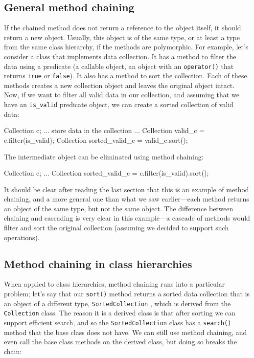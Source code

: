\subsection{General method chaining}

If the chained method does not return a reference to the object itself, it should return a new object. Usually, this object is of the same type, or at least a type from the same class hierarchy, if the methods are polymorphic. For example, let's consider a class that implements data collection. It has a method to filter the data using a predicate (a callable object, an object with an \texttt{operator()} that returns \texttt{true} or \texttt{false}). It also has a method to sort the collection. Each of these methods creates a new collection object and leaves the original object intact. Now, if we want to filter all valid data in our collection, and assuming that we have an \texttt{is\_valid} predicate object, we can create a sorted collection of valid data:

\begin{code}
Collection c;
... store data in the collection ...
Collection valid_c = c.filter(is_valid);
Collection sorted_valid_c = valid_c.sort();
\end{code}

The intermediate object can be eliminated using method chaining:

\begin{code}
Collection c;
...
Collection sorted_valid_c = c.filter(is_valid).sort();
\end{code}

It should be clear after reading the last section that this is an example of method chaining, and a more general one than what we saw earlier---each method returns an object of the same type, but not the same object. The difference between chaining and cascading is very clear in this example---a cascade of methods would filter and sort the original collection (assuming we decided to support such operations).

\subsection{Method chaining in class hierarchies}

When applied to class hierarchies, method chaining runs into a particular problem; let's say that our \texttt{sort()} method returns a sorted data collection that is an object of a different type, \texttt{SortedCollection} , which is derived from the \texttt{Collection} class. The reason it is a derived class is that after sorting we can support efficient search, and so the \texttt{SortedCollection} class has a \texttt{search()} method that the base class does not have. We can still use method chaining, and even call the base class methods on the derived class, but doing so breaks the chain:

